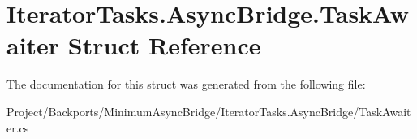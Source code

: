 \hypertarget{struct_iterator_tasks_1_1_async_bridge_1_1_task_awaiter}{}\section{Iterator\+Tasks.\+Async\+Bridge.\+Task\+Awaiter Struct Reference}
\label{struct_iterator_tasks_1_1_async_bridge_1_1_task_awaiter}


The documentation for this struct was generated from the following file\+:\begin{DoxyCompactItemize}
\item 
Project/\+Backports/\+Minimum\+Async\+Bridge/\+Iterator\+Tasks.\+Async\+Bridge/Task\+Awaiter.\+cs\end{DoxyCompactItemize}
